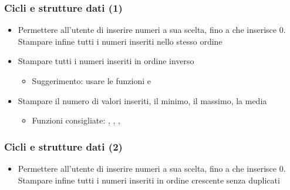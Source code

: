 

\begin{exerciseframe}
    \frametitle{Cicli e strutture dati (1)}

    \begin{itemize}
        \item Permettere all'utente di inserire numeri a sua scelta, fino a che inserisce $0$. Stampare infine tutti i numeri inseriti nello stesso ordine
        
        \pause
        \bigskip
        \item Stampare tutti i numeri inseriti in ordine inverso
        \begin{itemize}
            \item Suggerimento: usare le funzioni  e 
        \end{itemize}

        \pause
        \bigskip
        \item Stampare il numero di valori inseriti, il minimo, il massimo, la media
        \begin{itemize}
            \item Funzioni consigliate: , , , 
        \end{itemize}
    \end{itemize}
\end{exerciseframe}

\begin{exerciseframe}
    \frametitle{Cicli e strutture dati (2)}

    \begin{itemize}
        \item Permettere all'utente di inserire numeri a sua scelta, fino a che inserisce $0$. Stampare infine tutti i numeri inseriti in ordine crescente senza duplicati
    \end{itemize}
\end{exerciseframe}

